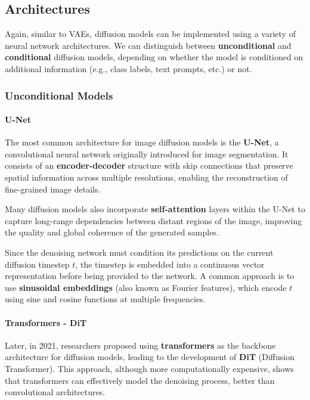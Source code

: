 \subsection{Architectures}

Again, similar to VAEs, diffusion models can be implemented using a variety of neural network architectures. 
We can distinguish between \textbf{unconditional} and \textbf{conditional} diffusion models, depending on whether the model is conditioned on additional information (e.g., class labels, text prompts, etc.) or not.

\subsubsection{Unconditional Models}
\paragraph{U-Net}
The most common architecture for image diffusion models is the \textbf{U-Net}, a convolutional neural network originally introduced for image segmentation. 
It consists of an \textbf{encoder-decoder} structure with skip connections that preserve spatial information across multiple resolutions, enabling the reconstruction of fine-grained image details.

Many diffusion models also incorporate \textbf{self-attention} layers within the U-Net to capture long-range dependencies between distant regions of the image, improving the quality and global coherence of the generated samples.

Since the denoising network must condition its predictions on the current diffusion timestep \(t\), the timestep is embedded into a continuous vector representation before being provided to the network. 
A common approach is to use \textbf{sinusoidal embeddings} (also known as Fourier features), which encode \(t\) using sine and cosine functions at multiple frequencies. 

\paragraph{Transformers - DiT}
Later, in 2021, researchers proposed using \textbf{transformers} as the backbone architecture for diffusion models, leading to the development of \textbf{DiT} (Diffusion Transformer).
This approach, although more computationally expensive, shows that transformers can effectively model the denoising process, better than convolutional architectures.

